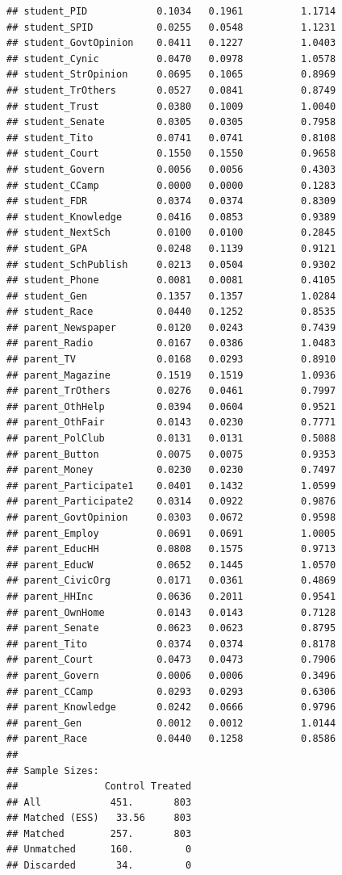 \documentclass[
]{article}
\begin{document}
\begin{verbatim}
## student_PID            0.1034   0.1961          1.1714
## student_SPID           0.0255   0.0548          1.1231
## student_GovtOpinion    0.0411   0.1227          1.0403
## student_Cynic          0.0470   0.0978          1.0578
## student_StrOpinion     0.0695   0.1065          0.8969
## student_TrOthers       0.0527   0.0841          0.8749
## student_Trust          0.0380   0.1009          1.0040
## student_Senate         0.0305   0.0305          0.7958
## student_Tito           0.0741   0.0741          0.8108
## student_Court          0.1550   0.1550          0.9658
## student_Govern         0.0056   0.0056          0.4303
## student_CCamp          0.0000   0.0000          0.1283
## student_FDR            0.0374   0.0374          0.8309
## student_Knowledge      0.0416   0.0853          0.9389
## student_NextSch        0.0100   0.0100          0.2845
## student_GPA            0.0248   0.1139          0.9121
## student_SchPublish     0.0213   0.0504          0.9302
## student_Phone          0.0081   0.0081          0.4105
## student_Gen            0.1357   0.1357          1.0284
## student_Race           0.0440   0.1252          0.8535
## parent_Newspaper       0.0120   0.0243          0.7439
## parent_Radio           0.0167   0.0386          1.0483
## parent_TV              0.0168   0.0293          0.8910
## parent_Magazine        0.1519   0.1519          1.0936
## parent_TrOthers        0.0276   0.0461          0.7997
## parent_OthHelp         0.0394   0.0604          0.9521
## parent_OthFair         0.0143   0.0230          0.7771
## parent_PolClub         0.0131   0.0131          0.5088
## parent_Button          0.0075   0.0075          0.9353
## parent_Money           0.0230   0.0230          0.7497
## parent_Participate1    0.0401   0.1432          1.0599
## parent_Participate2    0.0314   0.0922          0.9876
## parent_GovtOpinion     0.0303   0.0672          0.9598
## parent_Employ          0.0691   0.0691          1.0005
## parent_EducHH          0.0808   0.1575          0.9713
## parent_EducW           0.0652   0.1445          1.0570
## parent_CivicOrg        0.0171   0.0361          0.4869
## parent_HHInc           0.0636   0.2011          0.9541
## parent_OwnHome         0.0143   0.0143          0.7128
## parent_Senate          0.0623   0.0623          0.8795
## parent_Tito            0.0374   0.0374          0.8178
## parent_Court           0.0473   0.0473          0.7906
## parent_Govern          0.0006   0.0006          0.3496
## parent_CCamp           0.0293   0.0293          0.6306
## parent_Knowledge       0.0242   0.0666          0.9796
## parent_Gen             0.0012   0.0012          1.0144
## parent_Race            0.0440   0.1258          0.8586
## 
## Sample Sizes:
##               Control Treated
## All            451.       803
## Matched (ESS)   33.56     803
## Matched        257.       803
## Unmatched      160.         0
## Discarded       34.         0
\end{verbatim}
\end{document}
